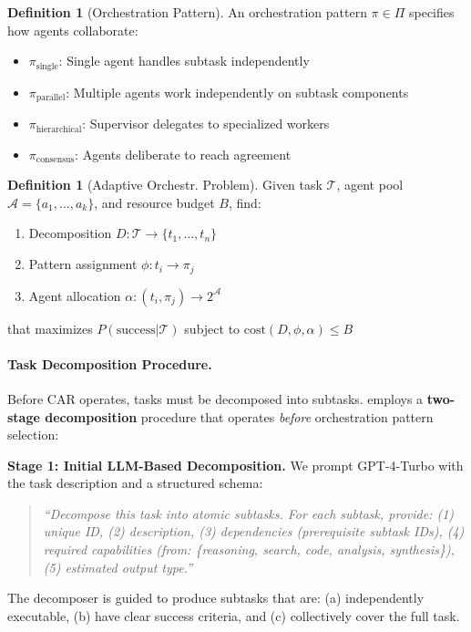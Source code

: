 \documentclass{article}
\theoremstyle{plain}
\theoremstyle{definition}
\newtheorem{definition}[theorem]{Definition}
\theoremstyle{remark}
\begin{document}
\begin{definition}[Orchestration Pattern]
	An orchestration pattern $\pi \in \Pi$ specifies how agents collaborate:
	\begin{itemize}[nosep,leftmargin=*]
		\item $\pi_{\text{single}}$: Single agent handles subtask independently
		\item $\pi_{\text{parallel}}$: Multiple agents work independently on subtask components
		\item $\pi_{\text{hierarchical}}$: Supervisor delegates to specialized workers
		\item $\pi_{\text{consensus}}$: Agents deliberate to reach agreement
	\end{itemize}
\end{definition}

\begin{definition}[Adaptive Orchestr. Problem]
	Given task $\mathcal{T}$, agent pool $\mathcal{A} = \{a_1, \ldots, a_k\}$, and resource budget $B$, find:
	\begin{enumerate}[nosep,leftmargin=*]
		\item Decomposition $D: \mathcal{T} \rightarrow \{t_1, \ldots, t_n\}$
		\item Pattern assignment $\phi: t_i \rightarrow \pi_j$
		\item Agent allocation $\alpha: (t_i, \pi_j) \rightarrow 2^{\mathcal{A}}$
	\end{enumerate}
	that maximizes $P(\text{success} | \mathcal{T})$ subject to $\text{cost}(D, \phi, \alpha) \leq B$
\end{definition}

\paragraph{Task Decomposition Procedure.}
Before CAR operates, tasks must be decomposed into subtasks. \amore{} employs a \textbf{two-stage decomposition} procedure that operates \emph{before} orchestration pattern selection:

\textbf{Stage 1: Initial LLM-Based Decomposition.}
We prompt GPT-4-Turbo with the task description and a structured schema:
\begin{quote}
\small\textit{``Decompose this task into atomic subtasks. For each subtask, provide: (1) unique ID, (2) description, (3) dependencies (prerequisite subtask IDs), (4) required capabilities (from: \{reasoning, search, code, analysis, synthesis\}), (5) estimated output type.''}
\end{quote}
The decomposer is guided to produce subtasks that are: (a) independently executable, (b) have clear success criteria, and (c) collectively cover the full task.
\end{document}
